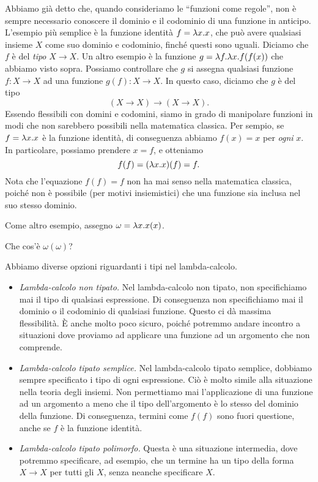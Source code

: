 \documentclass{article}
\begin{document}
Abbiamo gi\`a detto che, quando consideriamo le ``funzioni come regole'', 
non \`e sempre necessario conoscere il dominio e il codominio
di una funzione in anticipo. L'esempio pi\`u semplice \`e la funzione identit\`a
$f = \lambda x.x$, che pu\`o avere qualsiasi insieme $X$ come suo dominio e codominio,
finché questi sono uguali. Diciamo che
$f$ \`e del {\em tipo} $X\to X$. Un altro esempio \`e la funzione $g = \lambda f.\lambda
x.f(f(x))$ che abbiamo visto sopra. Possiamo controllare che $g$ si assegna 
qualsiasi funzione $f:X\to X$ ad una funzione $g(f):X\to X$. In questo caso, diciamo
che $g$ \`e del tipo
\[          (X\to X)\to(X\to X).
\]
Essendo flessibili con domini e codomini, siamo in grado
di manipolare funzioni in modi che non sarebbero possibili
nella matematica classica. Per sempio, se $f=\lambda x.x$ \`e la funzione identit\`a,
di conseguenza abbiamo $f(x) = x$ per {\em ogni} $x$. In particolare, possiamo prendere
$x=f$, e otteniamo
\[     f(f) = (\lambda x.x)(f) = f.
\]
Nota che l'equazione $f(f)=f$ non ha mai senso nella matematica
classica, poiché non \`e possibile (per motivi insiemistici) che una
funzione sia inclusa nel suo stesso dominio.

Come altro esempio, assegno $\omega = \lambda x.x(x)$. 

\begin{exercise}
  Che cos'\`e $\omega(\omega)$?
\end{exercise}

Abbiamo diverse opzioni riguardanti i tipi nel lambda-calcolo.
\begin{itemize}
\item {\em Lambda-calcolo non tipato.} Nel lambda-calcolo non tipato,
non specifichiamo mai il tipo di qualsiasi espressione. Di conseguenza
non specifichiamo mai il dominio o il codominio di qualsiasi funzione. Questo ci 
d\`a massima flessibilit\`a. \`E anche molto poco sicuro, poiché potremmo andare incontro a
situazioni dove proviamo ad applicare una funzione ad un argomento che
non comprende.
\item {\em Lambda-calcolo tipato semplice.} Nel lambda-calcolo tipato semplice,
dobbiamo sempre specificato i tipo di ogni espressione.
Ci\`o \`e molto simile alla situazione nella teoria degli insiemi. Non permettiamo
mai l'applicazione di una funzione ad un argomento a meno che il tipo
dell'argomento \`e lo stesso del dominio della funzione. Di conseguenza,
termini come $f(f)$ sono fuori questione, anche se $f$ \`e la funzione identit\`a.
\item {\em Lambda-calcolo tipato polimorfo.} Questa \`e una
situazione intermedia, dove potremmo specificare, ad esempio, che
un termine ha un tipo della forma $X\to X$ per tutti gli $X$, senza neanche
specificare $X$.
\end{itemize}
\end{document}
